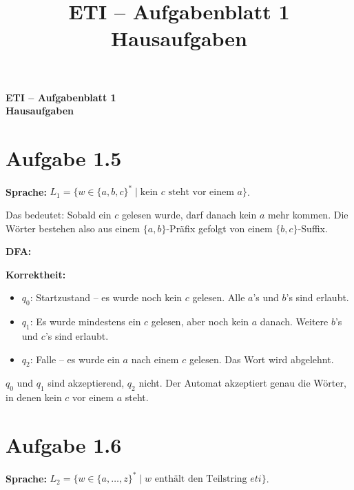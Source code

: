\documentclass[a4paper,12pt]{article}
\title{ETI -- Aufgabenblatt 1 \\ Hausaufgaben}
\author{}
\date{}
\begin{document}
\raggedright
\setlength{\parindent}{0pt}

{\LARGE\bfseries ETI -- Aufgabenblatt 1 \\ Hausaufgaben\par}
\vspace{2em}

\section*{Aufgabe 1.5}

\textbf{Sprache:} $L_1 = \{w \in \{a,b,c\}^* \mid \text{kein } c \text{ steht vor einem } a\}$.

Das bedeutet: Sobald ein $c$ gelesen wurde, darf danach kein $a$ mehr kommen. Die Wörter bestehen also aus einem $\{a,b\}$-Präfix gefolgt von einem $\{b,c\}$-Suffix.

\textbf{DFA:}

\begin{flushleft}
\end{flushleft}

\textbf{Korrektheit:}
\begin{itemize}
    \item $q_0$: Startzustand -- es wurde noch kein $c$ gelesen. Alle $a$'s und $b$'s sind erlaubt.
    \item $q_1$: Es wurde mindestens ein $c$ gelesen, aber noch kein $a$ danach. Weitere $b$'s und $c$'s sind erlaubt.
    \item $q_2$: Falle -- es wurde ein $a$ nach einem $c$ gelesen. Das Wort wird abgelehnt.
\end{itemize}
$q_0$ und $q_1$ sind akzeptierend, $q_2$ nicht. Der Automat akzeptiert genau die Wörter, in denen kein $c$ vor einem $a$ steht.

\section*{Aufgabe 1.6}

\textbf{Sprache:} $L_2 = \{w \in \{a,\ldots,z\}^* \mid w \text{ enthält den Teilstring } eti\}$.
\end{document}
